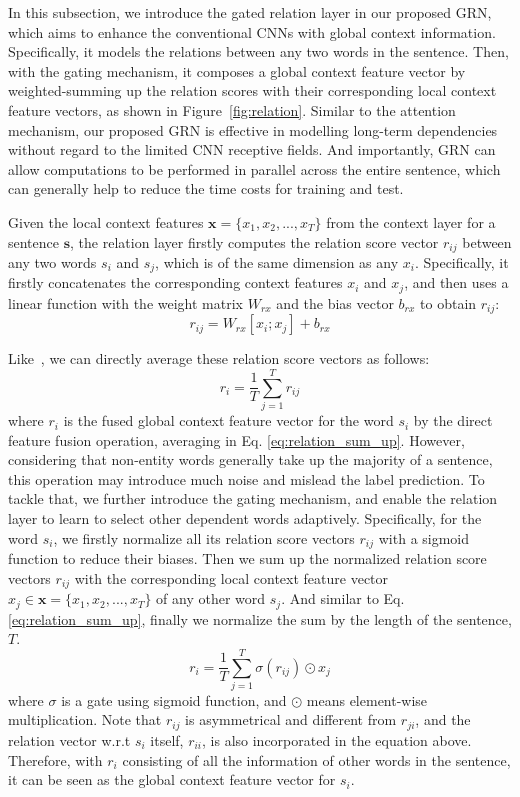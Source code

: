 \documentclass[letterpaper]{article} \usepackage{aaai19}  \usepackage{times}  \usepackage{helvet}  \usepackage{courier}  \usepackage{url}  \usepackage{graphicx}  \usepackage{amsmath}
\newcommand{\ie}{\text{i.e.,}}
\newcommand{\GRN}{GRN}
\begin{document}
In this subsection, we introduce the gated relation layer in our proposed \GRN{}, which aims to enhance the conventional CNNs with global context information. Specifically, it models the relations between any two words in the sentence. Then, with the gating mechanism, it composes a global context feature vector by weighted-summing up the relation scores with their corresponding local context feature vectors, as shown in Figure~\ref{fig:relation}. Similar to the attention mechanism, our proposed \GRN{} is effective in modelling long-term dependencies without regard to the limited CNN receptive fields. And importantly, \GRN{} can allow computations to be performed in parallel across the entire sentence, which can generally help to reduce the time costs for training and test.





Given the local context features $\bm{x}=\{x_1,x_2,...,x_T\}$ from the context layer for a sentence $\bm{s}$, the relation layer firstly computes the relation score vector $r_{ij}$ between any two words $s_i$ and $s_j$, which is of the same dimension as any $x_i$. Specifically, it firstly concatenates the corresponding context features $x_i$ and $x_j$, and then uses a linear function with the weight matrix $W_{rx}$ and the bias vector $b_{rx}$ to obtain $r_{ij}$:
\begin{equation}
r_{ij} = W_{rx}[x_i;x_j] + b_{rx}
\end{equation}

Like~\cite{santoro2017simple}, we can directly average these relation score vectors as follows:
\begin{equation}
r_i = \frac{1}{T}\sum_{j=1}^T r_{ij}
\label{eq:relation_sum_up}
\end{equation}
where $r_i$ is the fused global context feature vector for the word $s_i$ by the direct feature fusion operation, \ie{} averaging in Eq. \ref{eq:relation_sum_up}. However, considering that non-entity words generally take up the majority of a sentence,  this operation may introduce much noise and mislead the label prediction. To tackle that, we further introduce the gating mechanism, and enable the relation layer to learn to select other dependent words adaptively. Specifically, for the word $s_i$, we firstly normalize all its relation score vectors $r_{ij}$ with a sigmoid function to reduce their biases. Then we sum up the normalized relation score vectors $r_{ij}$ with the corresponding local context feature vector $x_j \in \bm{x}=\{x_1,x_2,...,x_T\}$ of any other word $s_j$. And similar to Eq. \ref{eq:relation_sum_up}, finally we normalize the sum by the length of the sentence, \ie{} $T$.
\begin{equation}
r_i = \frac{1}{T}\sum_{j=1}^T \sigma(r_{ij}) \odot x_j
\label{eq:relation_gate}
\end{equation}
where $\sigma$ is a gate using sigmoid function, and $\odot$ means element-wise multiplication. Note that $r_{ij}$ is asymmetrical and different from $r_{ji}$, and the relation vector w.r.t $s_i$ itself, \ie{} $r_{ii}$, is also incorporated in the equation above. Therefore, with $r_i$ consisting of all the information of other words in the sentence, it can be seen as the global context feature vector for $s_i$.
\end{document}
